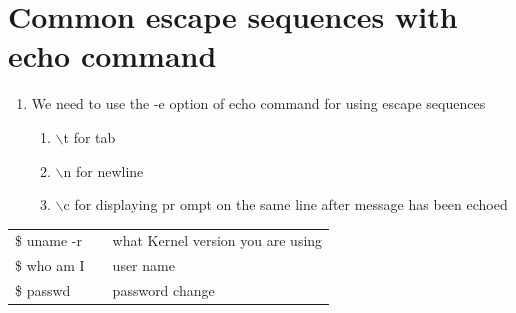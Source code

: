 \documentclass[12pt, a4paper]{report}
\begin{document}
\section{Common escape sequences with echo command}
\begin{enumerate}
\item We need to use the -e option of echo command for using escape sequences 
\begin{enumerate}
\item $\backslash$t for tab 
\item $\backslash$n for newline
\item $\backslash$c for displaying pr	ompt on the same line after message has been echoed
\end{enumerate}
\end{enumerate}
\begin{tabular}{|lcl|}\hline
\$ uname -r && what Kernel version you are using\\
\$ who am I && user name\\
\$ passwd && password change\\ \hline
\end{tabular}
\end{document}
